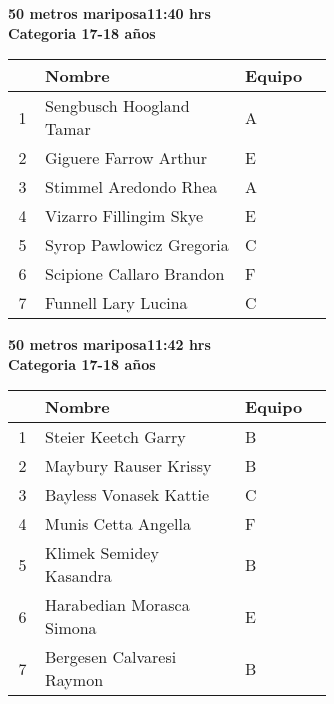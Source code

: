 \begin{minipage}{0.95\linewidth}\vspace{0.5cm} 
\begin{flushleft}
\textbf{
\hspace{-0.15cm}50 metros mariposa\hspace{1.5cm}11:40 hrs \\Categoria 17-18 años}\vspace{-0.2cm} 
\end{flushleft}
\begin{tabular}{cp{0.63\linewidth}l}
\hline
& \textbf{Nombre} & \textbf{Equipo} \\ \hline
1 & Sengbusch Hoogland Tamar & A \\ 
2 & Giguere Farrow Arthur & E \\ 
3 & Stimmel Aredondo Rhea & A \\ 
4 & Vizarro Fillingim Skye & E \\ 
5 & Syrop Pawlowicz Gregoria & C \\ 
6 & Scipione Callaro Brandon & F \\ 
7 & Funnell Lary Lucina & C \\ 
\end{tabular}
\end{minipage}
\begin{minipage}{0.95\linewidth}\vspace{0.5cm} 
\begin{flushleft}
\textbf{
\hspace{-0.15cm}50 metros mariposa\hspace{1.5cm}11:42 hrs \\Categoria 17-18 años}\vspace{-0.2cm} 
\end{flushleft}
\begin{tabular}{cp{0.63\linewidth}l}
\hline
& \textbf{Nombre} & \textbf{Equipo} \\ \hline
1 & Steier Keetch Garry & B \\ 
2 & Maybury Rauser Krissy & B \\ 
3 & Bayless Vonasek Kattie & C \\ 
4 & Munis Cetta Angella & F \\ 
5 & Klimek Semidey Kasandra & B \\ 
6 & Harabedian Morasca Simona & E \\ 
7 & Bergesen Calvaresi Raymon & B \\ 
\end{tabular}
\end{minipage}

